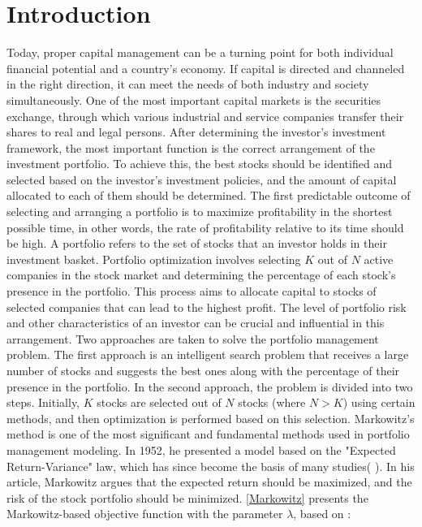 \documentclass[preprint,12pt,authoryear]{elsarticle}
\begin{document}
\section{Introduction}
\label{sec:Introduction}
Today, proper capital management can be a turning point for both individual financial potential and a country's economy. If capital is directed and channeled in the right direction, it can meet the needs of both industry and society simultaneously. One of the most important capital markets is the securities exchange, through which various industrial and service companies transfer their shares to real and legal persons. After determining the investor's investment framework, the most important function is the correct arrangement of the investment portfolio. To achieve this, the best stocks should be identified and selected based on the investor's investment policies, and the amount of capital allocated to each of them should be determined. The first predictable outcome of selecting and arranging a portfolio is to maximize profitability in the shortest possible time, in other words, the rate of profitability relative to its time should be high.
A portfolio refers to the set of stocks that an investor holds in their investment basket. Portfolio optimization involves selecting $K$ out of $N$ active companies in the stock market and determining the percentage of each stock's presence in the portfolio. This process aims to allocate capital to stocks of selected companies that can lead to the highest profit. The level of portfolio risk and other characteristics of an investor can be crucial and influential in this arrangement. Two approaches are taken to solve the portfolio management problem. The first approach is an intelligent search problem that receives a large number of stocks and suggests the best ones along with the percentage of their presence in the portfolio. In the second approach, the problem is divided into two steps. Initially, $K$ stocks are selected out of $N$ stocks (where $N > K$) using certain methods, and then optimization is performed based on this selection.
Markowitz's method is one of the most significant and fundamental methods used in portfolio management modeling. In 1952, he presented a model based on the  {\ttfamily"}Expected Return-Variance{\ttfamily"} law, which has since become the basis of many studies( \cite{markowitz1952}). In his article, Markowitz argues that the expected return should be maximized, and the risk of the stock portfolio should be minimized. \ref{Markowitz} presents the Markowitz-based objective function with the parameter $\lambda$, based on \cite{markowitz1959portfolio}:
\end{document}
